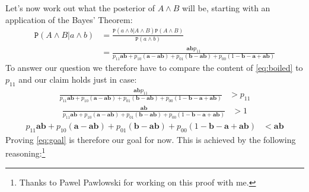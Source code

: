 \documentclass{ifcolog}
\newcommand{\pr}[1]{\mbox{$\mathtt{P}(#1)$}}
\newcommand{\et}{\wedge}
\begin{document}
Let's now work out what the posterior of $A\et B$ will be, starting with an application of the Bayes' Theorem:
\begin{align} \nonumber
\pr{A\et B \vert a\et b} & = \frac{\pr{a\et b \vert A \et B}\pr{A\et B}}{\pr{a\et b}}
\\ \label{eq:boiled}
& = \frac{\mathbf{ab}p_{11}}{p_{11}\mathbf{ab} + p_{10}(\mathbf{a}-\mathbf{ab}) + p_{01}(\mathbf{b}-\mathbf{ab})+p_{00}(1-\mathbf{b}-\mathbf{a}+\mathbf{ab})}
\end{align}
To answer our question we therefore have to compare the content of \eqref{eq:boiled} to $p_{11}$ and our claim holds just in case:
\begin{align*}
\frac{\mathbf{ab}p_{11}}{p_{11}\mathbf{ab} + p_{10}(\mathbf{a}-\mathbf{ab}) + p_{01}(\mathbf{b}-\mathbf{ab})+p_{00}(1-\mathbf{b}-\mathbf{a}+\mathbf{ab})} &> p_{11}
\end{align*}
\begin{align*}
 \frac{\mathbf{ab}}{p_{11}\mathbf{ab} + p_{10}(\mathbf{a}-\mathbf{ab}) + p_{01}(\mathbf{b}-\mathbf{ab})+p_{00}(1-\mathbf{b}-\mathbf{a}+\mathbf{ab})} & > 1\end{align*}
 \begin{align}  
 \label{eq:goal}
p_{11}\mathbf{ab} + p_{10}(\mathbf{a}-\mathbf{ab}) + p_{01}(\mathbf{b}-\mathbf{ab})+p_{00}(1-\mathbf{b}-\mathbf{a}+\mathbf{ab}) & < \mathbf{ab}
\end{align}
Proving \eqref{eq:goal} is therefore our goal for now. This is achieved by the following reasoning:\footnote{Thanks to Pawel Pawlowski for working on this proof with me.}
\end{document}
